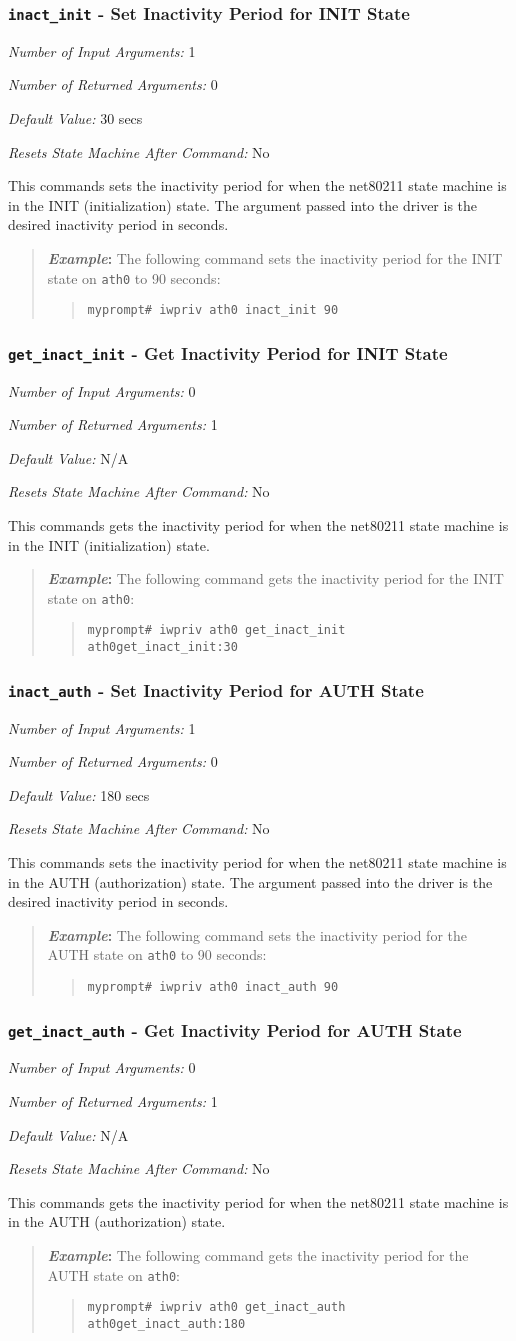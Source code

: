 \documentclass[10pt,fullpage]{article}
\newcommand{\mytt}[1]{{\texttt{#1}}}
\newcommand{\bv}{\begin{verse}}
\newcommand{\ev}{\end{verse}}
\newcommand{\cmd}[1]{{\texttt{myprompt\# #1}}}
\newcommand{\argdesc}[4]{\begin{description}
\itemsep -6pt
\item \textit{Number of Input Arguments:} #1
\item \textit{Number of Returned Arguments:} #2
\item \textit{Default Value:} #3
\item \textit{Resets State Machine After Command:} #4
\end{description}
}
\newenvironment{example}{\begin{quote}\textbf{\textit{Example}:}}{\end{quote}}
\begin{document}
\subsubsection{\mytt{inact\_init} - Set Inactivity Period for INIT
  State}
\argdesc{1}{0}{30 secs}{No}
This commands sets the inactivity period for when the net80211 state
machine is in the INIT (initialization) state.  The argument passed
into the driver is the desired inactivity period in seconds.
\begin{example}
  The following command sets the inactivity period for the INIT state
  on \mytt{ath0} to 90 seconds:
  \bv
  \cmd{iwpriv ath0 inact\_init 90}\\
  \ev
\end{example}

\subsubsection{\mytt{get\_inact\_init} - Get Inactivity Period for INIT
  State}
\argdesc{0}{1}{N/A}{No}
This commands gets the inactivity period for when the net80211 state
machine is in the INIT (initialization) state.
\begin{example}
  The following command gets the inactivity period for the INIT state
  on \mytt{ath0}:
  \bv
  \cmd{iwpriv ath0 get\_inact\_init}\\
  \mytt{ath0\hspace{32pt}get\_inact\_init:30}
  \ev
\end{example}

\subsubsection{\mytt{inact\_auth} - Set Inactivity Period for AUTH
  State}
\argdesc{1}{0}{180 secs}{No}
This commands sets the inactivity period for when the net80211 state
machine is in the AUTH (authorization) state.  The argument passed
into the driver is the desired inactivity period in seconds.
\begin{example}
  The following command sets the inactivity period for the AUTH state
  on \mytt{ath0} to 90 seconds:
  \bv
  \cmd{iwpriv ath0 inact\_auth 90}\\
  \ev
\end{example}

\subsubsection{\mytt{get\_inact\_auth} - Get Inactivity Period for AUTH
  State}
\argdesc{0}{1}{N/A}{No}
This commands gets the inactivity period for when the net80211 state
machine is in the AUTH (authorization) state.
\begin{example}
  The following command gets the inactivity period for the AUTH state
  on \mytt{ath0}:
  \bv
  \cmd{iwpriv ath0 get\_inact\_auth}\\
  \mytt{ath0\hspace{32pt}get\_inact\_auth:180}
  \ev
\end{example}
\end{document}
